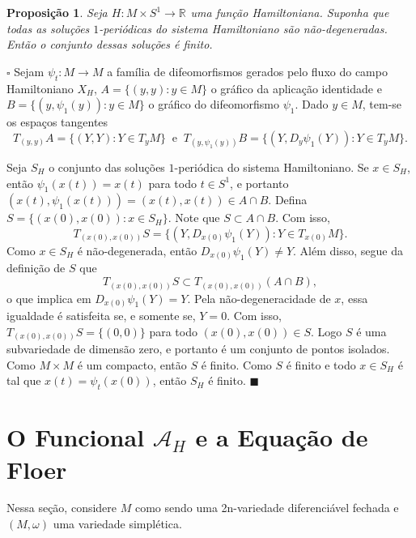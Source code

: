 \documentclass[12pt]{book}
\newtheorem{proposicao}[teorema]{Proposição}
\newenvironment{prova}[1]{$\square$ #1}{\hfill$\blacksquare$}
\newcommand{\campohamiltonianoabrev}{X_{H}}
\newcommand{\circulo}{S^{1}}
\newcommand{\espacotangenteponto}[2]{T_{#1}#2}
\newcommand{\funcionalH}{\mathcal{A}_{H}}
\newcommand{\real}[1]{\mathbb{R}^{#1}}
\newcommand{\reta}{\real{}}
\begin{document}
	\begin{proposicao}\label{proposicao_solucao_hamiltoniana_finita}
		Seja $H:M\times\circulo\to \reta$ uma função Hamiltoniana. Suponha que todas as soluções $1$-periódicas do sistema Hamiltoniano são não-degeneradas. Então o conjunto dessas soluções é finito.
	\end{proposicao}
	\begin{prova}
		Sejam $\psi_{t}: M\to M$ a família de difeomorfismos gerados pelo fluxo do campo Hamiltoniano $\campohamiltonianoabrev$, $A =\{(y, y):y\in M\}$ o gráfico da aplicação identidade e $B=\{(y, \psi_{1}(y)) :y\in M \}$ o gráfico do difeomorfismo $\psi_{1}$. Dado $y \in M$, tem-se os espaços tangentes 
		$$\espacotangenteponto{(y,y)}{A} = \{(Y,Y):Y\in \espacotangenteponto{y}{M}\}\;\; \text{e}\;\; \espacotangenteponto{(y,\psi_{1}(y))}{B} = \{(Y,D_{y}\psi_{1}(Y)):Y\in \espacotangenteponto{y}{M}\}.
		$$
		
		Seja $S_{H}$ o conjunto das soluções $1$-periódica do sistema Hamiltoniano. Se $x\in S_{H}$, então $\psi_{1}(x(t)) = x(t)$ para todo $t\in \circulo$, e portanto $(x(t), \psi_{1}(x(t)))=(x(t), x(t))\in A\cap B$. Defina $S=\{(x(0), x(0)):x\in S_{H} \}$. Note que $S \subset A\cap B$. Com isso, 
		$$
		\espacotangenteponto{(x(0), x(0))}{S}=\{(Y,D_{x(0)}\psi_{1}(Y)):Y\in \espacotangenteponto{x(0)}{M}\}.
		$$
		Como $x\in S_{H}$ é não-degenerada, então $D_{x(0)}\psi_{1}(Y)\neq Y$. Além disso, segue da definição de $S$ que
		$$
		\espacotangenteponto{(x(0), x(0))}{S} \subset \espacotangenteponto{(x(0), x(0))}{(A \cap B)},
		$$
		o que implica em $D_{x(0)}\psi_{1}(Y) = Y$. Pela não-degeneracidade de $x$, essa igualdade é satisfeita se, e somente se, $Y=0$. Com isso, $\espacotangenteponto{(x(0), x(0))}{S}=\{(0,0)\}$ para todo $(x(0), x(0)) \in S$. Logo $S$ é uma subvariedade de dimensão zero, e portanto é um conjunto de pontos isolados. Como $M\times M$ é um compacto, então $S$ é finito. Como $S$ é finito e todo $x \in S_{H}$ é tal que $x(t) = \psi_{t}(x(0))$, então $S_{H}$ é finito.
	\end{prova}
	
	
	\section{O Funcional $\funcionalH$ e a Equação de Floer}\label{secao_funcional_hamiltoniano}
	
	Nessa seção, considere $M$ como sendo uma 2n-variedade diferenciável fechada e $(M, \omega)$ uma variedade simplética.
	
\end{document}
